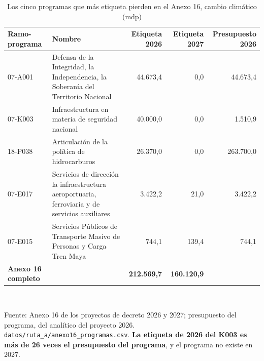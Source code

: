\begin{table}[htbp]\centering\footnotesize
\caption{Los cinco programas que más etiqueta pierden en el Anexo 16, cambio climático (mdp)}\label{cua:anexo16}
\begin{tabular}{l>{\raggedright\arraybackslash}p{4.6cm}rrr}
\toprule
Ramo-programa & Nombre & Etiqueta 2026 & Etiqueta 2027 & Presupuesto 2026 \\
\midrule
07-A001 & Defensa de la Integridad, la Independencia, la Soberanía del Territorio Nacional & 44.673,4 & 0,0 & 44.673,4 \\
07-K003 & Infraestructura en materia de seguridad nacional & 40.000,0 & 0,0 & 1.510,9 \\
18-P038 & Articulación de la política de hidrocarburos & 26.370,0 & 0,0 & 263.700,0 \\
07-E017 & Servicios de dirección la infraestructura aeroportuaria, ferroviaria y de servicios auxiliares & 3.422,2 & 21,0 & 3.422,2 \\
07-E015 & Servicios Públicos de Transporte Masivo de Personas y Carga Tren Maya & 744,1 & 139,4 & 744,1 \\
\midrule \textbf{Anexo 16 completo} & & \textbf{212.569,7} & \textbf{160.120,9} &  \\
\bottomrule
\end{tabular}
\\[2pt]\begin{minipage}{0.92\textwidth}\scriptsize Fuente: Anexo 16 de los proyectos de decreto 2026 y 2027; presupuesto del programa, del analítico del proyecto 2026. \texttt{datos/ruta\_a/anexo16\_programas.csv}. \textbf{La etiqueta de 2026 del K003 es más de 26 veces el presupuesto del programa}, y el programa no existe en 2027.\end{minipage}
\end{table}
